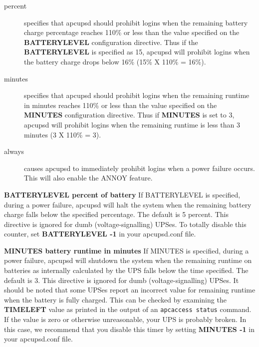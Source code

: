 {{{{{{{\begin{description}
\begin{description}
\item [percent]
   specifies that apcupsd should prohibit logins when the remaining battery
charge percentage reaches 110\% or less than the value specified on the {\bf
BATTERYLEVEL} configuration directive. Thus if the {\bf BATTERYLEVEL} is
specified as 15, apcupsd will prohibit logins when the battery charge drops
below 16\% (15\% X 110\% = 16\%).  

\item [minutes]
   specifies that apcupsd should prohibit logins when the remaining runtime in
minutes reaches 110\% or less than the value specified on the {\bf MINUTES}
configuration directive.  Thus if {\bf MINUTES} is set to 3, apcupsd will
prohibit logins when the remaining runtime is less than 3 minutes (3 X 110\% =
3).  

\item [always]
   causes apcupsd to immediately prohibit logins when a power failure occurs.
This will also enable the ANNOY feature. 
\end{description}


\item {\bf BATTERYLEVEL \lt{}percent of battery\gt{}}
   If BATTERYLEVEL is specified, during a power failure, apcupsd will halt the
system when the remaining battery charge falls below the specified percentage.
The default is 5 percent. This directive is ignored for dumb
(voltage-signalling) UPSes. To totally disable this counter, set {\bf
BATTERYLEVEL -1} in your apcupsd.conf file.  

\item {\bf MINUTES \lt{}battery runtime in minutes\gt{}}
   If MINUTES is specified, during a power failure, apcupsd will shutdown the
system when the remaining runtime on batteries as internally calculated by the
UPS falls below the time specified. The default is 3. This directive is
ignored for dumb (voltage-signalling) UPSes. It should be noted that some
UPSes report an incorrect value for remaining runtime when the battery is
fully charged. This can be checked by examining the {\bf TIMELEFT} value as
printed in the output of an {\tt apcaccess status} command. If the value is
zero or otherwise unreasonable, your UPS is probably broken. In this case, we
recommend that you disable this timer by setting {\bf MINUTES -1} in your
apcupsd.conf file.  


\end{description}}}}}}}}
